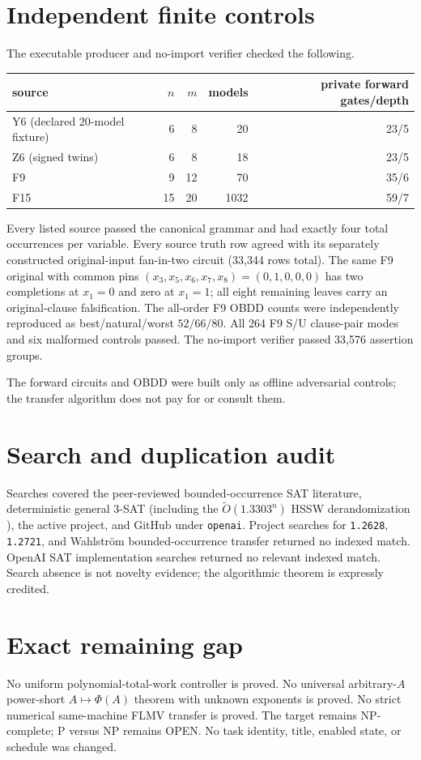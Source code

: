 \documentclass[11pt]{article}
\begin{document}
\section{Independent finite controls}
The executable producer and no-import verifier checked the following.
\begin{center}\begin{tabular}{lrrrr}
\toprule source&$n$&$m$&models&private forward gates/depth\\\midrule
Y6 (declared 20-model fixture)&6&8&20&23/5\\
Z6 (signed twins)&6&8&18&23/5\\
F9&9&12&70&35/6\\
F15&15&20&1032&59/7\\\bottomrule
\end{tabular}\end{center}
Every listed source passed the canonical grammar and had exactly four total
occurrences per variable.  Every source truth row agreed with its separately
constructed original-input fan-in-two circuit (33,344 rows total).  The same
F9 original with common pins
$(x_3,x_5,x_6,x_7,x_8)=(0,1,0,0,0)$ has two completions at $x_1=0$ and zero at
$x_1=1$; all eight remaining leaves carry an original-clause falsification.
The all-order F9 OBDD counts were independently reproduced as best/natural/worst
$52/66/80$.  All 264 F9 S/U clause-pair modes and six malformed controls
passed.  The no-import verifier passed 33,576 assertion groups.

The forward circuits and OBDD were built only as offline adversarial controls;
the transfer algorithm does not pay for or consult them.

\section{Search and duplication audit}
Searches covered the peer-reviewed bounded-occurrence SAT literature,
deterministic general 3-SAT (including the $\widetilde O(1.3303^n)$ HSSW
derandomization \cite{makino11}), the active project, and GitHub under
\texttt{openai}.  Project searches for \texttt{1.2628}, \texttt{1.2721}, and
Wahlstr\"om bounded-occurrence transfer returned no indexed match.  OpenAI SAT
implementation searches returned no relevant indexed match.  Search absence
is not novelty evidence; the algorithmic theorem is expressly credited.

\section{Exact remaining gap}
No uniform polynomial-total-work controller is proved.  No universal
arbitrary-$A$ power-short $A\mapsto\Phi(A)$ theorem with unknown exponents is
proved.  No strict numerical same-machine FLMV transfer is proved.  The target
remains NP-complete; P versus NP remains OPEN.  No task identity, title,
enabled state, or schedule was changed.
\end{document}
